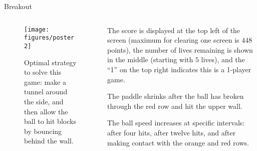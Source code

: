 \documentclass[10pt, aspectratio=169, compress, protectframetitle, handout]{beamer}
\begin{document}
\begin{frame}{Breakout}

        \begin{columns}[onlytextwidth]
        \begin{column}{.4\textwidth}
            \begin{figure}
                \centering
                \texttt{[image: figures/poster2]}
                \caption{Optimal strategy to solve this game: make a tunnel around the side, and then allow the ball to hit blocks by bouncing behind the wall.}
            \end{figure}
        \end{column}
        \begin{column}{.55\textwidth}
        
            The score is displayed at the top left of the screen (maximum for clearing one screen is $448$ points), the number of lives remaining is shown in the middle (starting with $5$ lives), and the ``1'' on the top right indicates this is a 1-player game.
            \medskip
            
            The paddle shrinks after the ball has broken through the red row and hit the upper wall.
            \medskip
            
            The ball speed increases at specific intervals: after four hits, after twelve hits, and after making contact with the orange and red rows.
        \end{column}
    \end{columns}
    
\end{frame}
\end{document}
